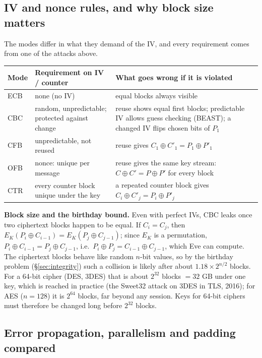 \subsection{IV and nonce rules, and why block size matters \hot\new}

The modes differ in what they demand of the IV, and every requirement comes from one of the attacks above.
\begin{center}\small
\begin{tabularx}{\textwidth}{@{}l l X@{}}
\toprule
Mode & Requirement on IV / counter & What goes wrong if it is violated\\
\midrule
ECB & none (no IV) & equal blocks always visible\\
CBC & random, unpredictable; protected against change & reuse shows equal first blocks; predictable IV allows guess checking (BEAST); a changed IV flips chosen bits of $P_1$\\
CFB & unpredictable, not reused & reuse gives $C_1 \oplus C'_1 = P_1 \oplus P'_1$\\
OFB & nonce: unique per message & reuse gives the same key stream: $C \oplus C' = P \oplus P'$ for every block\\
CTR & every counter block unique under the key & a repeated counter block gives $C_i \oplus C'_j = P_i \oplus P'_j$\\
\bottomrule
\end{tabularx}
\end{center}

\textbf{Block size and the birthday bound.} Even with perfect IVs, CBC leaks once two ciphertext blocks happen to be equal. If $C_i = C_j$, then $E_K(P_i \oplus C_{i-1}) = E_K(P_j \oplus C_{j-1})$; since $E_K$ is a permutation, $P_i \oplus C_{i-1} = P_j \oplus C_{j-1}$, i.e.\ $P_i \oplus P_j = C_{i-1} \oplus C_{j-1}$, which Eve can compute. The ciphertext blocks behave like random $n$-bit values, so by the birthday problem (\S\ref{sec:integrity}) such a collision is likely after about $1.18 \times 2^{n/2}$ blocks. For a 64-bit cipher (DES, 3DES) that is about $2^{32}$ blocks $= 32$ GB under one key, which is reached in practice (the Sweet32 attack on 3DES in TLS, 2016); for AES ($n = 128$) it is $2^{64}$ blocks, far beyond any session. Keys for 64-bit ciphers must therefore be changed long before $2^{32}$ blocks.

\subsection{Error propagation, parallelism and padding compared \hot\new}


